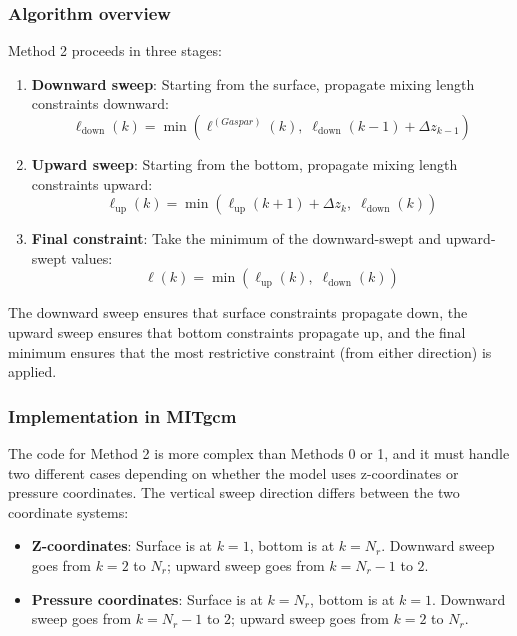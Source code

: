 \documentclass[12pt,letterpaper]{article}
\begin{document}
\subsubsection{Algorithm overview}

Method 2 proceeds in three stages:

\begin{enumerate}
\item \textbf{Downward sweep}: Starting from the surface, propagate mixing length constraints downward:
\begin{equation}
\ell_{\text{down}}(k) = \min\left( \ell^{(Gaspar)}(k), \; \ell_{\text{down}}(k-1) + \Delta z_{k-1} \right)
\label{eq:mxl_downsweep}
\end{equation}

\item \textbf{Upward sweep}: Starting from the bottom, propagate mixing length constraints upward:
\begin{equation}
\ell_{\text{up}}(k) = \min\left( \ell_{\text{up}}(k+1) + \Delta z_k, \; \ell_{\text{down}}(k) \right)
\label{eq:mxl_upsweep}
\end{equation}

\item \textbf{Final constraint}: Take the minimum of the downward-swept and upward-swept values:
\begin{equation}
\ell(k) = \min\left( \ell_{\text{up}}(k), \; \ell_{\text{down}}(k) \right)
\label{eq:mxl_final}
\end{equation}
\end{enumerate}

The downward sweep ensures that surface constraints propagate down, the upward sweep ensures that bottom constraints propagate up, and the final minimum ensures that the most restrictive constraint (from either direction) is applied.

\subsubsection{Implementation in MITgcm}

The code for Method 2 is more complex than Methods 0 or 1, and it must handle two different cases depending on whether the model uses z-coordinates or pressure coordinates. The vertical sweep direction differs between the two coordinate systems:

\begin{itemize}
\item \textbf{Z-coordinates}: Surface is at $k=1$, bottom is at $k=N_r$. Downward sweep goes from $k=2$ to $N_r$; upward sweep goes from $k=N_r-1$ to $2$.
\item \textbf{Pressure coordinates}: Surface is at $k=N_r$, bottom is at $k=1$. Downward sweep goes from $k=N_r-1$ to $2$; upward sweep goes from $k=2$ to $N_r$.
\end{itemize}
\end{document}
